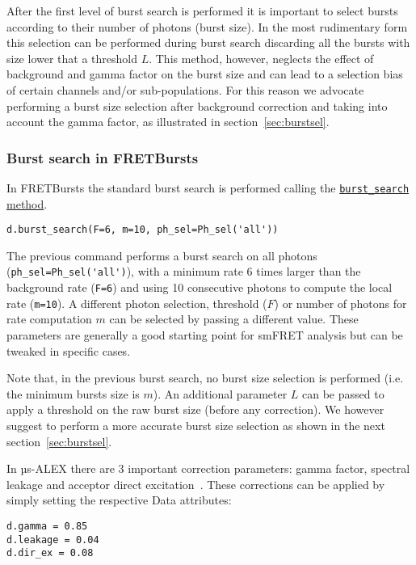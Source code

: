 After the first level of burst search is performed it is important to select
bursts according to their number of photons (burst size). In the most
rudimentary form this selection can be performed during burst search discarding
all the bursts
with size lower that a threshold $L$. This method, however, neglects the effect
of background and gamma factor on the burst size and can lead to a selection
bias of certain channels and/or sub-populations. 
For this reason we advocate performing a burst size selection after background
correction and taking into account the gamma factor, as illustrated in
section~\ref{sec:burstsel}.

\subsubsection{Burst search in FRETBursts}
\label{sec:burstsearch_code}

In FRETBursts the standard burst search is performed calling the
\href{http://fretbursts.readthedocs.org/en/latest/data\_class.html#fretbursts.burstlib.Data.burst\_search}{\texttt{burst\_search} method}.

\begin{verbatim}
d.burst_search(F=6, m=10, ph_sel=Ph_sel('all'))
\end{verbatim}

The previous command performs a burst search on all photons
(\verb|ph_sel=Ph_sel('all')|), with a minimum rate 6 times larger than the
background rate (\verb|F=6|) and using 10 consecutive photons to compute the
local rate (\verb|m=10|).
A different photon selection, threshold ($F$) or number of photons for rate
computation $m$ can be selected by passing a different value. These parameters
are generally a good starting point for smFRET analysis but can be tweaked in
specific cases.

Note that, in the previous burst search, no burst size selection is performed
(i.e. the minimum bursts size is $m$). 
An additional parameter $L$ can be passed to apply a threshold on the raw burst
size (before any correction). 
We however suggest to perform a more accurate burst size selection as shown in
the next section~\ref{sec:burstsel}.

In µs-ALEX there are 3 important correction parameters: gamma factor, spectral
leakage and 
acceptor direct excitation~\cite{Lee_2005}. These corrections can be applied by
simply setting the respective
Data attributes:

\begin{verbatim}
d.gamma = 0.85
d.leakage = 0.04
d.dir_ex = 0.08
\end{verbatim}


